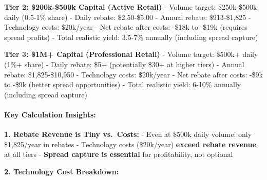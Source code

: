 \textbf{Tier 2: \$200k-\$500k Capital (Active Retail)} - Volume target:
\$250k-\$500k daily (0.5-1\% share) - Daily rebate: \$2.50-\$5.00 -
Annual rebate: \$913-\$1,825 - Technology costs: \$20k/year - Net rebate
after costs: -\$18k to -\$19k (requires spread profits) - Total
realistic yield: 3.5-7\% annually (including spread capture)

\textbf{Tier 3: \$1M+ Capital (Professional Retail)} - Volume target:
\$500k+ daily (1\%+ share) - Daily rebate: \$5+ (potentially \$30+ at
higher tiers) - Annual rebate: \$1,825-\$10,950 - Technology costs:
\$20k/year - Net rebate after costs: -\$9k to -\$9k (better spread
opportunities) - Total realistic yield: 6-10\% annually (including
spread capture)

\hypertarget{key-calculation-insights}{%
\paragraph{\texorpdfstring{\textbf{Key Calculation
Insights:}}{Key Calculation Insights:}}\label{key-calculation-insights}}

\textbf{1. Rebate Revenue is Tiny vs.~Costs:} - Even at \$500k daily
volume: only \$1,825/year in rebates - Technology costs (\$20k/year)
\textbf{exceed rebate revenue} at all tiers - \textbf{Spread capture is
essential} for profitability, not optional

\textbf{2. Technology Cost Breakdown:}

\begin{Shaded}
\begin{Highlighting}[]
\OperatorTok{=}\NormalTok{ \{}
        \NormalTok{: }\NormalTok{,    }
        \NormalTok{: }\NormalTok{,             }
        \NormalTok{: }\NormalTok{,       }
        \NormalTok{: }\NormalTok{,      }
        \NormalTok{: }
\NormalTok{    \}}
\OperatorTok{=}\NormalTok{ monthly\_costs[}\NormalTok{] }\OperatorTok{/}   
\end{Highlighting}
\end{Shaded}

